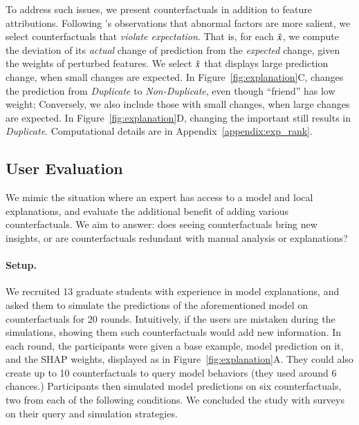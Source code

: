 To address such issues, we present \sysname counterfactuals in addition to feature attributions.
Following \citet{miller}'s observations that abnormal factors are more salient, we select counterfactuals that \emph{violate expectation}.
That is, for each $\hat{x}$, we compute the deviation of its \emph{actual} change of prediction from the \emph{expected} change, given the weights of perturbed features.
We select $\hat{x}$ that displays large prediction change, when small changes are expected. 
In Figure~\ref{fig:explanation}C,  changes the prediction from \emph{Duplicate} to \emph{Non-Duplicate}, even though ``friend'' has low weight; 
Conversely, we also include those with small changes, when large changes are expected.
In Figure~\ref{fig:explanation}D, changing the important  still results in \emph{Duplicate}.
Computational details are in Appendix~\ref{appendix:exp_rank}.

\subsection{User Evaluation}
\label{subsec:exp_user_study}
\newcommand{\cshap}{\emph{SHAP-c}\xspace}
\newcommand{\crandom}{\emph{Random}\xspace}
\newcommand{\chuman}{\emph{Human}\xspace}

We mimic the situation where an expert has access to a model and local explanations, and evaluate the additional benefit of adding various counterfactuals. 
We aim to answer: does seeing counterfactuals bring new insights, or are counterfactuals redundant with manual analysis or explanations?

\paragraph{Setup.}
We recruited 13 graduate students with experience in model explanations, and asked them to simulate the predictions of the aforementioned \qqp model on counterfactuals for 20 rounds.
Intuitively, if the users are mistaken during the simulations, showing them such counterfactuals would add new information.
In each round, the participants were given a base example, model prediction on it, and the SHAP weights, displayed as in Figure~\ref{fig:explanation}A.
They could also create up to 10 counterfactuals to query model behaviors (they used around 6 chances.)
Participants then simulated model predictions on six counterfactuals, two from each of the following conditions.
We concluded the study with surveys on their query and simulation strategies.

